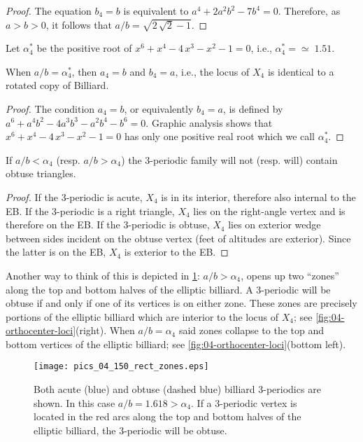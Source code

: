 \begin{proof}
The equation $b_4=b$ is equivalent to $a^4+2a^2b^2-7b^4=0.$ Therefore, as $a>b>0$, it follows that $a/b=\sqrt{2\,\sqrt {2}-1}.$
\end{proof}

\noindent Let $\alpha_4^*$ be the positive root of
${x}^{6}+{x}^{4}-4\,{x}^{3}-{x}^{2}-1=0$, i.e.,
$\alpha_4^{*}={\simeq}\;1.51$. 

\begin{proposition}
When $a/b=\alpha_4^{*}$, then $a_4=b$ and $b_4=a$, i.e., the locus of $X_4$ is identical to a rotated copy of Billiard. 
\end{proposition}

\begin{proof}
The condition $a_4=b$, or equivalently $b_4=a$, is defined by $a^6+a^4b^2-4a^3b^3-a^2b^4-b^6=0$. Graphic analysis shows that ${x}^{6}+{x}^{4}-4\,{x}^{3}-{x}^{2}-1=0$ has only one positive real root which we call $\alpha_4^*$.
\end{proof}

\begin{theorem}
If $a/b<\alpha_4$ (resp. $a/b>\alpha_4$) the 3-periodic family will not (resp. will) contain obtuse triangles.
\end{theorem}

\begin{proof}
If the 3-periodic is acute, $X_4$ is in its interior, therefore also internal to the EB. If the 3-periodic is a right triangle, $X_4$ lies on the right-angle vertex and is therefore on the EB. If the 3-periodic is obtuse, $X_4$ lies on exterior wedge between sides incident on the obtuse vertex (feet of altitudes are exterior). Since the latter is on the EB, $X_4$ is exterior to the EB.
\end{proof}

Another way to think of this is depicted in \cref{fig:04-obtuse-zones}: $a/b>\alpha_4$, opens up two ``zones'' along the top and bottom halves of the elliptic billiard. A 3-periodic will be obtuse if and only if one of its vertices is on either zone. These zones are precisely portions of the elliptic billiard which are interior to the locus of $X_4$; see \cref{fig:04-orthocenter-loci}(right). When $a/b=\alpha_4$ said zones collapse to the top and bottom vertices of the elliptic billiard; see \cref{fig:04-orthocenter-loci}(bottom left).

\begin{figure}
    \centering
    \texttt{[image: pics\_04\_150\_rect\_zones.eps]}
    \caption{Both acute (blue) and obtuse (dashed blue) billiard 3-periodics are shown. In this case $a/b=1.618>\alpha_4$. If a 3-periodic vertex is located in the red arcs along the top and bottom halves of the elliptic billiard, the 3-periodic will be obtuse.}
\label{fig:04-obtuse-zones}
\end{figure}

